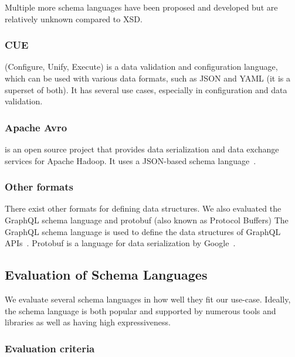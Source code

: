 Multiple more schema languages have been proposed and developed but are relatively unknown compared to XSD\cite{xml_schemas_1,xml_schemas_2}.

\subsubsection{CUE}\cite{cuelang} %
(Configure, Unify, Execute) is a data validation and configuration language, which can be used with various data formats, such as JSON and YAML (it is a superset of both).
It has several use cases, especially in configuration and data validation.


\subsubsection{Apache Avro}%
is an open source project that provides data serialization and data exchange services for Apache Hadoop.
It uses a JSON-based schema language~\cite{Apache-Avro}.


\subsubsection{Other formats}

There exist other formats for defining data structures.
We also evaluated the GraphQL schema language and protobuf (also known as Protocol Buffers)
The GraphQL schema language is used to define the data structures of GraphQL APIs~\cite{graphQL}.
Protobuf is a language for data serialization by Google~\cite{protobufProtocolBuffers}.


\subsection{Evaluation of Schema Languages}\label{subsec:evaluation-of-schema-languages}



We evaluate several schema languages in how well they fit our use-case.
Ideally, the schema language is both popular and supported by numerous tools and libraries as well as having high expressiveness.

\subsubsection{Evaluation criteria} %

